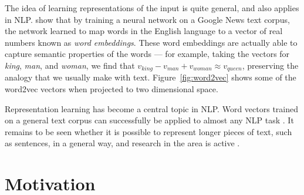 \documentclass[12pt]{report}
\begin{document}
The idea of learning representations of the input is quite general, and also applies in NLP.
\citet{mikolov2013word2vec} show that by training a neural network on a Google News text corpus, the network learned to map words in the English language to a vector of real numbers known as \emph{word embeddings}. These word embeddings are actually able to capture semantic properties of the words --- for example, taking the vectors for \emph{king}, \emph{man}, and \emph{woman}, we find that $v_{king} - v_{man} + v_{woman} \approx v_{queen}$, preserving the analogy that we usually make with text. Figure~\ref{fig:word2vec} shows some of the word2vec vectors when projected to two dimensional space.

Representation learning has become a central topic in NLP. Word vectors trained on a general text corpus can successfully be applied to almost any NLP task \citep{mikolov2013word2vec, Pennington2014}.
It remains to be seen whether it is possible to represent longer pieces of text, such as sentences, in a general way, and research in the area is active \citep{Bowman2016}.

%
%
%
%
%
%




\section{Motivation}
\end{document}
